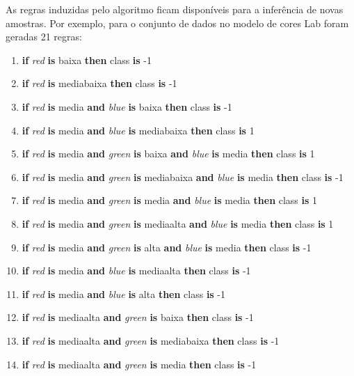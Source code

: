 As regras induzidas pelo algoritmo ficam disponíveis para a inferência de novas amostras. Por exemplo, para o conjunto de dados no modelo de cores Lab foram geradas 21 regras:
\begin{enumerate}[itemsep=0mm]
\item \textbf{if} \emph{red} \textbf{is} baixa \textbf{then} class \textbf{is} -1
\item \textbf{if} \emph{red} \textbf{is} mediabaixa \textbf{then} class \textbf{is} -1
\item \textbf{if} \emph{red} \textbf{is} media  \textbf{and} \emph{blue} \textbf{is} baixa \textbf{then} class \textbf{is} -1
\item \textbf{if} \emph{red} \textbf{is} media  \textbf{and} \emph{blue} \textbf{is} mediabaixa \textbf{then} class \textbf{is} 1
\item \textbf{if} \emph{red} \textbf{is} media  \textbf{and} \emph{green} \textbf{is} baixa  \textbf{and} \emph{blue} \textbf{is} media \textbf{then} class \textbf{is} 1
\item \textbf{if} \emph{red} \textbf{is} media  \textbf{and} \emph{green} \textbf{is} mediabaixa  \textbf{and} \emph{blue} \textbf{is} media \textbf{then} class \textbf{is} -1
\item \textbf{if} \emph{red} \textbf{is} media  \textbf{and} \emph{green} \textbf{is} media  \textbf{and} \emph{blue} \textbf{is} media \textbf{then} class \textbf{is} 1
\item \textbf{if} \emph{red} \textbf{is} media  \textbf{and} \emph{green} \textbf{is} mediaalta  \textbf{and} \emph{blue} \textbf{is} media \textbf{then} class \textbf{is} 1
\item \textbf{if} \emph{red} \textbf{is} media  \textbf{and} \emph{green} \textbf{is} alta  \textbf{and} \emph{blue} \textbf{is} media \textbf{then} class \textbf{is} -1
\item \textbf{if} \emph{red} \textbf{is} media  \textbf{and} \emph{blue} \textbf{is} mediaalta \textbf{then} class \textbf{is} -1
\item \textbf{if} \emph{red} \textbf{is} media  \textbf{and} \emph{blue} \textbf{is} alta \textbf{then} class \textbf{is} -1
\item \textbf{if} \emph{red} \textbf{is} mediaalta  \textbf{and} \emph{green} \textbf{is} baixa \textbf{then} class \textbf{is} -1
\item \textbf{if} \emph{red} \textbf{is} mediaalta  \textbf{and} \emph{green} \textbf{is} mediabaixa \textbf{then} class \textbf{is} -1
\item \textbf{if} \emph{red} \textbf{is} mediaalta  \textbf{and} \emph{green} \textbf{is} media \textbf{then} class \textbf{is} -1

\end{enumerate}

